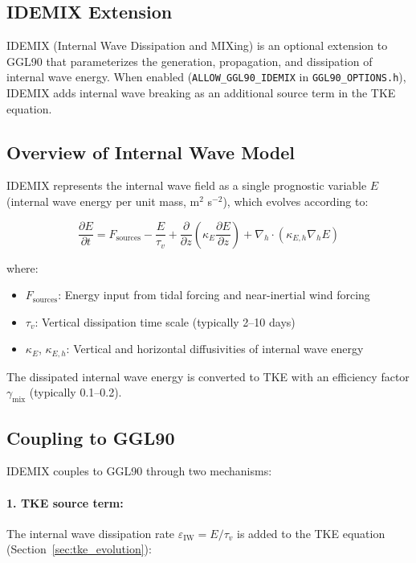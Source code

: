\documentclass[12pt,letterpaper]{article}
\begin{document}
\subsection{IDEMIX Extension}
\label{sec:idemix}

IDEMIX (Internal Wave Dissipation and MIXing) is an optional extension to GGL90 that parameterizes the generation, propagation, and dissipation of internal wave energy. When enabled (\verb|ALLOW_GGL90_IDEMIX| in \verb|GGL90_OPTIONS.h|), IDEMIX adds internal wave breaking as an additional source term in the TKE equation.

\subsection{Overview of Internal Wave Model}

IDEMIX represents the internal wave field as a single prognostic variable $E$ (internal wave energy per unit mass, m$^2$ s$^{-2}$), which evolves according to:

\begin{equation}
\frac{\partial E}{\partial t} = F_{\text{sources}} - \frac{E}{\tau_v} + \frac{\partial}{\partial z}\left(\kappa_E \frac{\partial E}{\partial z}\right) + \nabla_h \cdot (\kappa_{E,h} \nabla_h E)
\end{equation}

where:
\begin{itemize}
\item $F_{\text{sources}}$: Energy input from tidal forcing and near-inertial wind forcing
\item $\tau_v$: Vertical dissipation time scale (typically 2--10 days)
\item $\kappa_E$, $\kappa_{E,h}$: Vertical and horizontal diffusivities of internal wave energy
\end{itemize}

The dissipated internal wave energy is converted to TKE with an efficiency factor $\gamma_{\text{mix}}$ (typically 0.1--0.2).

\subsection{Coupling to GGL90}

IDEMIX couples to GGL90 through two mechanisms:

\paragraph{1. TKE source term:} The internal wave dissipation rate $\varepsilon_{\text{IW}} = E / \tau_v$ is added to the TKE equation (Section~\ref{sec:tke_evolution}):
\end{document}
